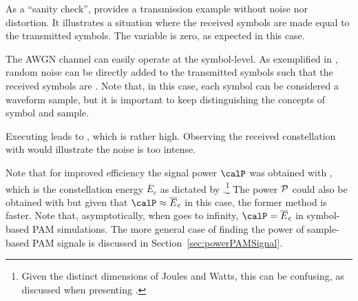 As a ``sanity check'',  provides a transmission example without noise nor distortion. It illustrates a situation where the received symbols are made equal to the transmitted symbols. The variable  is zero, as expected in this case.


The AWGN channel can easily operate at the symbol-level. As exemplified in , random noise  can be directly added to the transmitted symbols  such that the received symbols are . Note that, in this case, each symbol can be considered a waveform sample, but it is important to keep distinguishing the concepts of symbol and sample.


Executing   leads to , which is rather high. Observing the received constellation with  would illustrate the noise is too intense.

Note that for improved efficiency the signal power $\calP$ was obtained with , which is the constellation energy $\overline E_c$ as dictated by .\footnote{Given the distinct dimensions of Joules and Watts, this can be confusing, as discussed when presenting .}
The power $\cal P$ could also be obtained with  but given that $\calP \approx \overline E_c$ in this case, the former method is faster. Note that, asymptotically, when  goes to infinity, $\calP = \overline E_c$ in symbol-based PAM simulations. The more general case of finding the power of sample-based PAM signals is discussed in Section~\ref{sec:powerPAMSignal}.

